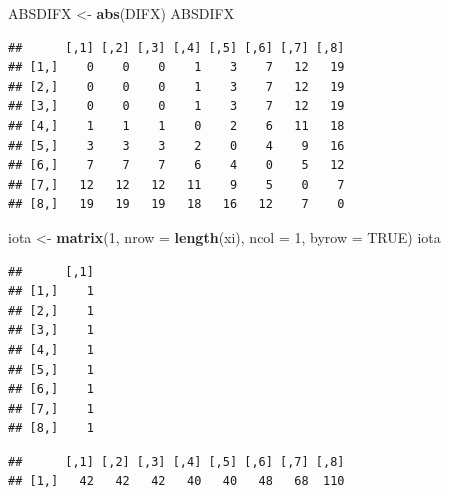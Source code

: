 \documentclass[
]{book}
\newenvironment{Shaded}{\begin{snugshade}}{\end{snugshade}}
\newcommand{\DataTypeTok}[1]{\textcolor[rgb]{0.13,0.29,0.53}{#1}}
\newcommand{\DecValTok}[1]{\textcolor[rgb]{0.00,0.00,0.81}{#1}}
\newcommand{\KeywordTok}[1]{\textcolor[rgb]{0.13,0.29,0.53}{\textbf{#1}}}
\newcommand{\NormalTok}[1]{#1}
\newcommand{\OperatorTok}[1]{\textcolor[rgb]{0.81,0.36,0.00}{\textbf{#1}}}
\newcommand{\OtherTok}[1]{\textcolor[rgb]{0.56,0.35,0.01}{#1}}
\newcommand{\StringTok}[1]{\textcolor[rgb]{0.31,0.60,0.02}{#1}}
\begin{document}
\begin{Shaded}
\begin{Highlighting}[]
\NormalTok{ABSDIFX <-}\StringTok{ }\KeywordTok{abs}\NormalTok{(DIFX)}
\NormalTok{ABSDIFX}
\end{Highlighting}
\end{Shaded}

\begin{verbatim}
##      [,1] [,2] [,3] [,4] [,5] [,6] [,7] [,8]
## [1,]    0    0    0    1    3    7   12   19
## [2,]    0    0    0    1    3    7   12   19
## [3,]    0    0    0    1    3    7   12   19
## [4,]    1    1    1    0    2    6   11   18
## [5,]    3    3    3    2    0    4    9   16
## [6,]    7    7    7    6    4    0    5   12
## [7,]   12   12   12   11    9    5    0    7
## [8,]   19   19   19   18   16   12    7    0
\end{verbatim}

\begin{Shaded}
\begin{Highlighting}[]
\NormalTok{iota <-}\StringTok{ }\KeywordTok{matrix}\NormalTok{(}\DecValTok{1}\NormalTok{, }\DataTypeTok{nrow =} \KeywordTok{length}\NormalTok{(xi), }\DataTypeTok{ncol =} \DecValTok{1}\NormalTok{, }\DataTypeTok{byrow =} \OtherTok{TRUE}\NormalTok{)}
\NormalTok{iota}
\end{Highlighting}
\end{Shaded}

\begin{verbatim}
##      [,1]
## [1,]    1
## [2,]    1
## [3,]    1
## [4,]    1
## [5,]    1
## [6,]    1
## [7,]    1
## [8,]    1
\end{verbatim}

\begin{Shaded}
\end{Shaded}

\begin{verbatim}
##      [,1] [,2] [,3] [,4] [,5] [,6] [,7] [,8]
## [1,]   42   42   42   40   40   48   68  110
\end{verbatim}

\begin{Shaded}
\end{Shaded}
\end{document}
